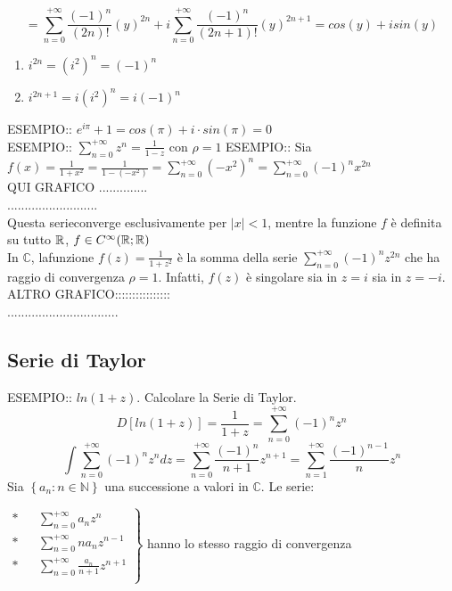 $$ = \sum\limits_{n=0}^{+\infty}\frac{(-1)^n}{(2n)!}(y)^{2n} + i\sum\limits_{n=0}^{+\infty}\frac{(-1)^n}{(2n+1)!}(y)^{2n+1} = cos(y)+isin(y)$$
\begin{enumerate}
	\item $i^{2n}=\left(i^2\right)^n=(-1)^n$
	\item $i^{2n+1}=i\left(i^2\right)^n=i(-1)^n$
\end{enumerate}
ESEMPIO:: $e^{i\pi}+1=cos(\pi)+i\cdot sin(\pi)=0$\\
ESEMPIO:: $\sum\limits_{n=0}^{+\infty}z^n=\frac{1}{1-z}$ con $\rho=1$
ESEMPIO:: Sia $f(x)=\frac{1}{1+x^2}=\frac{1}{1-(-x^2)} = \sum\limits_{n=0}^{+\infty}(-x^2)^n=\sum\limits_{n=0}^{+\infty}(-1)^nx^{2n}$\\
QUI GRAFICO ..............\\
..........................\\
Questa serieconverge esclusivamente per $\left|x\right|<1$, mentre la funzione $f$ è definita su tutto $ \mathbb{R}$, $f\in C^{\infty}( \mathbb{R}; \mathbb{R})$\\
In $\mathbb{C}$, lafunzione $f(z)=\frac{1}{1+z^2}$ è la somma della serie $\sum\limits_{n=0}^{+\infty}(-1)^nz^{2n}$ che ha raggio di convergenza  $\rho=1$. Infatti, $f(z)$ è singolare sia in $z=i$ sia in $z=-i$.\\
ALTRO GRAFICO::::::::::::::::\\
................................\\

\subsection{Serie di Taylor}
ESEMPIO:: $ln(1+z)$. Calcolare la Serie di Taylor.\\
$$D\left[ln(1+z)\right] = \frac{1}{1+z} = \sum\limits_{n=0}^{+\infty}(-1)^nz^n$$
$$\int \sum\limits_{n=0}^{+\infty}(-1)^nz^n dz = \sum\limits_{n=0}^{+\infty}\frac{(-1)^n}{n+1}z^{n+1}=\sum\limits_{n=1}^{+\infty}\frac{(-1)^{n-1}}{n}z^n$$
\proposition
Sia $\left\{a_n:n\in\mathbb{N}\right\}$ una successione a valori in $\mathbb{C}$. Le serie:
\begin{center}
	$\left.\begin{matrix}
	
	\ast&&\sum\limits_{n=0}^{+\infty}a_nz^n\\
	\ast&&\sum\limits_{n=0}^{+\infty}na_nz^{n-1}\\
	\ast&&\sum\limits_{n=0}^{+\infty}\frac{a_n}{n+1}z^{n+1}\\
	
	\end{matrix}\right\}$ hanno lo stesso raggio di convergenza
\end{center}

